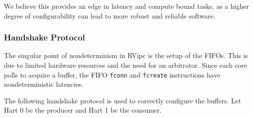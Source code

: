 We believe this provides an edge in latency and compute bound tasks, as a higher degree of configurability can lead to more robust and reliable software. 

\subsubsection{Handshake Protocol}
The singular point of nondeterminism in RVipc is the setup of the FIFOs. This is due to limited hardware resources and the need for an arbitrator. Since each core polls to acquire a buffer, the FIFO \texttt{fconn} and \texttt{fcreate} instructions have nondeterministic latencies.

The following handshake protocol is used to correctly configure the buffers. Let Hart 0 be the producer and Hart 1 be the consumer.

